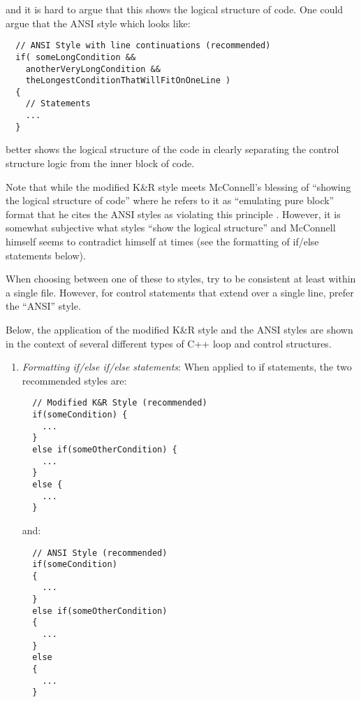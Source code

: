 \begin{enumerate}
{}\noindent{}and it is hard to argue that this shows the logical structure of
code.  One could argue that the ANSI style which looks like:

{\small\begin{verbatim}
  // ANSI Style with line continuations (recommended)
  if( someLongCondition &&
    anotherVeryLongCondition &&
    theLongestConditionThatWillFitOnOneLine )
  {
    // Statements
    ...
  }
\end{verbatim}}

better shows the logical structure of the code in clearly separating the
control structure logic from the inner block of code.

Note that while the modified K\&R style meets McConnell's blessing of
``showing the logical structure of code'' where he refers to it as ``emulating
pure block'' format that he cites the ANSI styles as violating this principle
{}\cite[Section 31.1]{CodeComplete2nd04}.  However, it is somewhat subjective
what styles ``show the logical structure'' and McConnell himself seems to
contradict himself at times (see the formatting of if/else statements below).

When choosing between one of these to styles, try to be consistent at least
within a single file.  However, for control statements that extend over a
single line, prefer the ``ANSI'' style.

Below, the application of the modified K\&R style and the ANSI styles are
shown in the context of several different types of C++ loop and control
structures.

  \begin{enumerate}

  {}\item\textit{Formatting if/else if/else statements}: When applied to if
  statements, the two recommended styles are:

  {\small\begin{verbatim}
  // Modified K&R Style (recommended)
  if(someCondition) {
    ...
  }
  else if(someOtherCondition) {
    ...
  }
  else {
    ...
  }
  \end{verbatim}}
  
  {}\noindent{}and:
  
  {\small\begin{verbatim}
  // ANSI Style (recommended)
  if(someCondition)
  {
    ...
  }
  else if(someOtherCondition)
  {
    ...
  }
  else
  {
    ...
  }
  \end{verbatim}}


\end{enumerate}
\end{enumerate}
